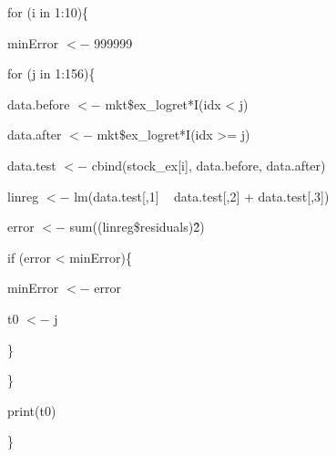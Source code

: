 \documentclass[10pt, conference]{IEEEtran}
\begin{document}
for (i in 1:10)\{

   	minError $<-$ 999999

   	for (j in 1:156)\{

		data.before $<-$ mkt\$ex\_logret*I(idx < j)

		data.after $<-$ mkt\$ex\_logret*I(idx >= j)

      	data.test $<-$ cbind(stock\_ex[i], data.before, data.after)

      	linreg $<-$ lm(data.test[,1] ~ data.test[,2] + data.test[,3])


		error $<-$ sum((linreg\$residuals)\^2)

		if (error < minError)\{

          		minError $<-$ error

          		t0 $<-$ j

		\}

   	\}

	print(t0)

\}	


\end{document}
